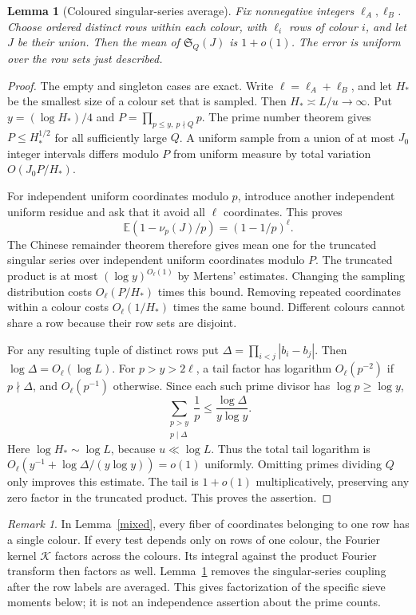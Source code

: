 \documentclass[11pt]{article}
\newtheorem{lemma}[theorem]{Lemma}
\theoremstyle{remark}
\newtheorem{remark}[theorem]{Remark}
\numberwithin{equation}{section}
\newcommand{\E}{\mathbb E}
\newcommand{\Sg}{\mathfrak S}
\begin{document}
\begin{lemma}[Coloured singular-series average]\label{av}
Fix nonnegative integers $\ell_A,\ell_B$. Choose ordered distinct
rows within each colour, with $\ell_i$ rows of colour $i$, and let
$J$ be their union. Then the mean of $\Sg_Q(J)$ is $1+o(1)$.
The error is uniform over the row sets just described.
\end{lemma}
\begin{proof}
The empty and singleton cases are exact. Write $\ell=\ell_A+\ell_B$,
and let $H_*$ be the smallest size of a colour set that is sampled.
Then $H_*\asymp L/u\to\infty$.
Put $y=(\log H_*)/4$ and
$P=\prod_{p\le y,\ p\nmid Q}p$. The prime number theorem gives
$P\le H_*^{1/2}$ for all sufficiently large $Q$.
A uniform sample from a union of at most $J_0$ integer intervals
differs modulo $P$ from uniform measure by total variation
$O(J_0P/H_*)$.

For independent uniform coordinates modulo $p$, introduce another
independent uniform residue and ask that it avoid all $\ell$
coordinates. This proves
\[
 \E(1-\nu_p(J)/p)=(1-1/p)^\ell.
\]
The Chinese remainder theorem therefore gives mean one for the
truncated singular series over independent uniform coordinates
modulo $P$. The truncated product is at most
$(\log y)^{O_\ell(1)}$ by Mertens' estimates.
Changing the sampling distribution costs
$O_\ell(P/H_*)$ times this bound. Removing repeated coordinates
within a colour costs $O_\ell(1/H_*)$ times the same bound.
Different colours cannot share a row because their row sets are
disjoint.

For any resulting tuple of distinct rows put
$\Delta=\prod_{i<j}|b_i-b_j|$. Then
$\log\Delta=O_\ell(\log L)$.
For $p>y>2\ell$, a tail factor has logarithm
$O_\ell(p^{-2})$ if $p\nmid\Delta$, and
$O_\ell(p^{-1})$ otherwise. Since each such prime divisor has
$\log p\ge\log y$,
\[
 \sum_{\substack{p>y\\p\mid\Delta}}\frac1p
 \le \frac{\log\Delta}{y\log y}.
\]
Here $\log H_*\sim\log L$, because $u\ll\log L$. Thus the total
tail logarithm is
$O_\ell(y^{-1}+\log\Delta/(y\log y))=o(1)$ uniformly.
Omitting primes dividing $Q$ only improves this estimate.
The tail is $1+o(1)$ multiplicatively, preserving any zero factor
in the truncated product. This proves the assertion.
\end{proof}

\begin{remark}\label{rem:factor}
In Lemma~\ref{mixed}, every fiber of coordinates belonging to
one row has a single colour. If every test depends only on rows
of one colour, the Fourier kernel $\mathcal K$ factors across the
colours. Its integral against the product Fourier transform then
factors as well. Lemma~\ref{av} removes the singular-series coupling
after the row labels are averaged. This gives factorization of the
specific sieve moments below; it is not an independence assertion
about the prime counts.
\end{remark}
\end{document}
